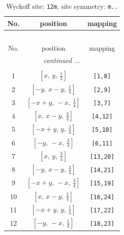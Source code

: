\documentclass[fleqn,8pt]{jsarticle}
\begin{document}
\begin{longtable}{ccc}
\caption{Wyckoff site: {\tt 12m}, site symmetry: {\tt m..}}
 \\
 \hline \hline
No. & position & mapping \\ \hline \endfirsthead

\multicolumn{2}{l}{\tablename\ \thetable{}} \\
 \hline \hline
No. & position & mapping \\ \hline \endhead

 \hline \hline
\multicolumn{2}{r}{\footnotesize\it continued ...} \\ \endfoot

 \hline \hline
\multicolumn{2}{r}{} \\ \endlastfoot

1 & $\left[ x,\, y,\, \frac{1}{4} \right]$ & {\tt [1,8]} \\ \hline
2 & $\left[ - y,\, x - y,\, \frac{1}{4} \right]$ & {\tt [2,9]} \\ \hline
3 & $\left[ - x + y,\, - x,\, \frac{1}{4} \right]$ & {\tt [3,7]} \\ \hline
4 & $\left[ x,\, x - y,\, \frac{3}{4} \right]$ & {\tt [4,12]} \\ \hline
5 & $\left[ - x + y,\, y,\, \frac{3}{4} \right]$ & {\tt [5,10]} \\ \hline
6 & $\left[ - y,\, - x,\, \frac{3}{4} \right]$ & {\tt [6,11]} \\ \hline
7 & $\left[ x,\, y,\, \frac{3}{4} \right]$ & {\tt [13,20]} \\ \hline
8 & $\left[ - y,\, x - y,\, \frac{3}{4} \right]$ & {\tt [14,21]} \\ \hline
9 & $\left[ - x + y,\, - x,\, \frac{3}{4} \right]$ & {\tt [15,19]} \\ \hline
10 & $\left[ x,\, x - y,\, \frac{1}{4} \right]$ & {\tt [16,24]} \\ \hline
11 & $\left[ - x + y,\, y,\, \frac{1}{4} \right]$ & {\tt [17,22]} \\ \hline
12 & $\left[ - y,\, - x,\, \frac{1}{4} \right]$ & {\tt [18,23]} \\
\end{longtable}
\renewcommand{\arraystretch}{1.2}
\end{document}
